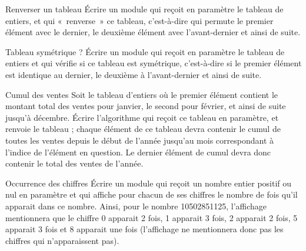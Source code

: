 \begin{Exercice}{Renverser un tableau}
	Écrire un module qui reçoit en paramètre le tableau
	 de  entiers, et qui
	«~renverse~» ce tableau, c’est-à-dire qui permute le premier élément
	avec le dernier, le deuxième élément avec l’avant-dernier et ainsi de
	suite.
\end{Exercice}

\begin{Exercice}{Tableau symétrique ?}
	Écrire un module qui reçoit en paramètre le tableau
	 de  entiers et qui
	vérifie si ce tableau est symétrique, c’est-à-dire si le premier
	élément est identique au dernier, le deuxième à l’avant-dernier et
	ainsi de suite.
\end{Exercice}

\begin{Exercice}{Cumul des ventes}
	Soit le tableau  d’entiers où le
	premier élément contient le montant total des ventes pour janvier, le
	second pour février, et ainsi de suite jusqu'à
	décembre. Écrire l’algorithme qui reçoit ce tableau en paramètre, et
	renvoie le tableau  ; chaque élément
	de ce tableau devra contenir le cumul de toutes les ventes depuis le
	début de l’année jusqu’au mois correspondant à
	l'indice de l’élément en question. Le dernier élément
	de cumul devra donc contenir le total des ventes de l’année.
\end{Exercice}

\begin{Exercice}{Occurrence des chiffres}
	Écrire un module qui reçoit un nombre entier positif ou nul en paramètre
	et qui affiche pour chacun de ses chiffres le nombre de fois qu’il
	apparait dans ce nombre. Ainsi, pour le nombre 10502851125, l’affichage
	mentionnera que le chiffre 0 apparait 2 fois, 1 apparait 3 fois, 2
	apparait 2 fois, 5 apparait 3 fois et 8 apparait une fois (l’affichage
	ne mentionnera donc pas les chiffres qui n’apparaissent pas).
\end{Exercice}

